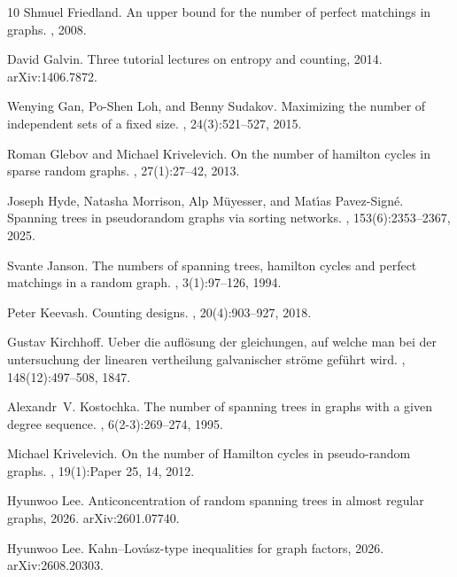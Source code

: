 \documentclass[10pt,a4paper]{amsart}
\numberwithin{equation}{section}
\theoremstyle{definition}
\theoremstyle{remark}
\begin{document}
\begin{thebibliography}{10}
Shmuel Friedland.
\newblock An upper bound for the number of perfect matchings in graphs.
, 2008.

David Galvin.
\newblock Three tutorial lectures on entropy and counting, 2014.
\newblock arXiv:1406.7872.

Wenying Gan, Po-Shen Loh, and Benny Sudakov.
\newblock Maximizing the number of independent sets of a fixed size.
, 24(3):521--527, 2015.

Roman Glebov and Michael Krivelevich.
\newblock On the number of hamilton cycles in sparse random graphs.
, 27(1):27--42, 2013.

Joseph Hyde, Natasha Morrison, Alp M\"{u}yesser, and Mat\'{\i}as Pavez-Sign\'{e}.
\newblock Spanning trees in pseudorandom graphs via sorting networks.
, 153(6):2353--2367, 2025.

Svante Janson.
\newblock The numbers of spanning trees, hamilton cycles and perfect matchings in a random graph.
, 3(1):97--126, 1994.

Peter Keevash.
\newblock Counting designs.
, 20(4):903--927, 2018.

Gustav Kirchhoff.
\newblock Ueber die aufl{\"o}sung der gleichungen, auf welche man bei der untersuchung der linearen vertheilung galvanischer str{\"o}me gef{\"u}hrt wird.
, 148(12):497--508, 1847.

Alexandr~V. Kostochka.
\newblock The number of spanning trees in graphs with a given degree sequence.
, 6(2-3):269--274, 1995.

Michael Krivelevich.
\newblock On the number of {H}amilton cycles in pseudo-random graphs.
, 19(1):Paper 25, 14, 2012.

Hyunwoo Lee.
\newblock Anticoncentration of random spanning trees in almost regular graphs, 2026.
\newblock arXiv:2601.07740.

Hyunwoo Lee.
\newblock Kahn--{Lov{\'a}sz}-type inequalities for graph factors, 2026.
\newblock arXiv:2608.20303.


\end{thebibliography}
\end{document}
